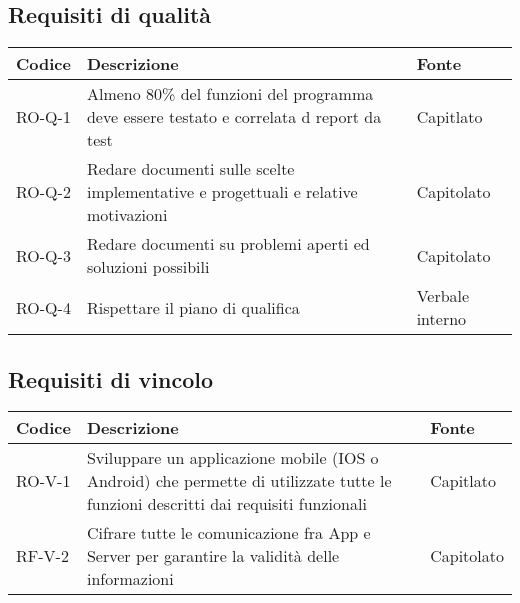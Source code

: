 \subsection{Requisiti di qualità}
\begin{center}
\renewcommand{\arraystretch}{1.8} %
\begin{tabular}{ | m{8em} | m{18em} | m{12em} | }
\hline
Codice&Descrizione&Fonte\\
\hline
RO-Q-1&Almeno 80\% del funzioni del programma deve essere testato  e correlata d report da test&Capitlato\\
\hline
RO-Q-2&Redare documenti sulle scelte implementative e progettuali e relative motivazioni&Capitolato\\
\hline
RO-Q-3&Redare documenti su problemi aperti ed soluzioni possibili&Capitolato\\
\hline
RO-Q-4&Rispettare il piano di qualifica&Verbale interno\\
\hline
\end{tabular}
\end{center}

\subsection{Requisiti di vincolo}
\begin{center}
\renewcommand{\arraystretch}{1.8} %
\begin{tabular}{ | m{8em} | m{18em} | m{12em} | }
\hline
Codice&Descrizione&Fonte\\
\hline
RO-V-1&Sviluppare un applicazione mobile (IOS o Android) che permette di utilizzate tutte le funzioni descritti dai requisiti funzionali&Capitlato\\
\hline
RF-V-2&Cifrare tutte le comunicazione fra App e Server per garantire la validità delle informazioni&Capitolato\\
\hline
\end{tabular}
\end{center}

